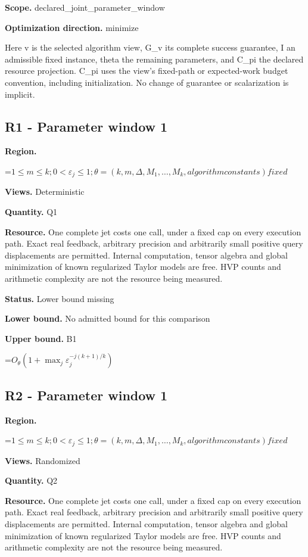 \documentclass[10pt,a4paper]{article}
\newcommand{\AtlasMath}[1]{\par\begingroup\centering\setbox0=\hbox{$\displaystyle #1$}\ifdim\wd0>1.4\linewidth\typeout{ATLAS WIDE FORMULA: \the\wd0}\fi\ifdim\wd0>\linewidth\resizebox{\linewidth}{!}{\box0}\else\box0\fi\par\endgroup}
\begin{document}
\textbf{Scope.} declared\_joint\_parameter\_window

\textbf{Optimization direction.} minimize

Here v is the selected algorithm view, G\_v its complete success guarantee, I an admissible fixed instance, theta the remaining parameters, and C\_pi the declared resource projection. C\_pi uses the view's fixed-path or expected-work budget convention, including initialization. No change of guarantee or scalarization is implicit.

\subsection{R1 - Parameter window 1}
\textbf{Region.} 
\AtlasMath{1\le m\le k;0<\varepsilon_j\le 1;\theta=(k,m,\Delta,M_1,\ldots,M_k,algorithm constants) fixed}


\textbf{Views.} Deterministic

\textbf{Quantity.} Q1

\textbf{Resource.} One complete jet costs one call, under a fixed cap on every execution path. Exact real feedback, arbitrary precision and arbitrarily small positive query displacements are permitted. Internal computation, tensor algebra and global minimization of known regularized Taylor models are free. HVP counts and arithmetic complexity are not the resource being measured.

\textbf{Status.} Lower bound missing

\textbf{Lower bound.} No admitted bound for this comparison

\textbf{Upper bound.} B1

\AtlasMath{O_\theta(1+\max_j \varepsilon_j^{-j(k+1)/k})}
\subsection{R2 - Parameter window 1}
\textbf{Region.} 
\AtlasMath{1\le m\le k;0<\varepsilon_j\le 1;\theta=(k,m,\Delta,M_1,\ldots,M_k,algorithm constants) fixed}


\textbf{Views.} Randomized

\textbf{Quantity.} Q2

\textbf{Resource.} One complete jet costs one call, under a fixed cap on every execution path. Exact real feedback, arbitrary precision and arbitrarily small positive query displacements are permitted. Internal computation, tensor algebra and global minimization of known regularized Taylor models are free. HVP counts and arithmetic complexity are not the resource being measured.
\end{document}
